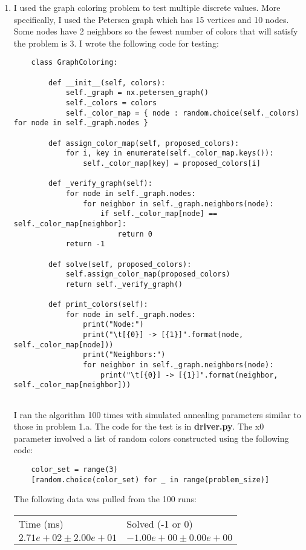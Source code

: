 \documentclass[11pt]{article}
\begin{document}
\begin{enumerate}
\begin{enumerate}
	\item I used the graph coloring problem to test multiple discrete values. More specifically, I used the Petersen graph which has 15 vertices and 10 nodes. Some nodes have 2 neighbors so the fewest number of colors that will satisfy the problem is 3. I wrote the following code for testing:
	
	\begin{lstlisting}
	class GraphColoring:
	
		def __init__(self, colors):
			self._graph = nx.petersen_graph()
			self._colors = colors
			self._color_map = { node : random.choice(self._colors) for node in self._graph.nodes }
		
		def assign_color_map(self, proposed_colors):
			for i, key in enumerate(self._color_map.keys()):
				self._color_map[key] = proposed_colors[i]
		
		def _verify_graph(self):
			for node in self._graph.nodes:
				for neighbor in self._graph.neighbors(node):
					if self._color_map[node] == self._color_map[neighbor]:
						return 0
			return -1
		
		def solve(self, proposed_colors):
			self.assign_color_map(proposed_colors)
			return self._verify_graph()
		
		def print_colors(self):
			for node in self._graph.nodes:
				print("Node:")
				print("\t[{0}] -> [{1}]".format(node, self._color_map[node]))
				print("Neighbors:")
				for neighbor in self._graph.neighbors(node):
					print("\t[{0}] -> [{1}]".format(neighbor, self._color_map[neighbor]))
	
	\end{lstlisting}
	
	I ran the algorithm 100 times with simulated annealing parameters similar to those in problem 1.a. The code for the test is in {\bf driver.py}. The x0 parameter involved a list of random colors constructed using the following code:
	
	\begin{lstlisting}
	color_set = range(3)
	[random.choice(color_set) for _ in range(problem_size)]
	\end{lstlisting}
	The following data was pulled from the 100 runs:\\
	
		\begin{tabular}{ll}
			Time (ms)         & Solved (-1 or 0)   \\
			$2.71e+02\pm2.00e+01$ & $-1.00e+00\pm0.00e+00$
		\end{tabular}
	

\end{enumerate}
\end{enumerate}
\end{document}
